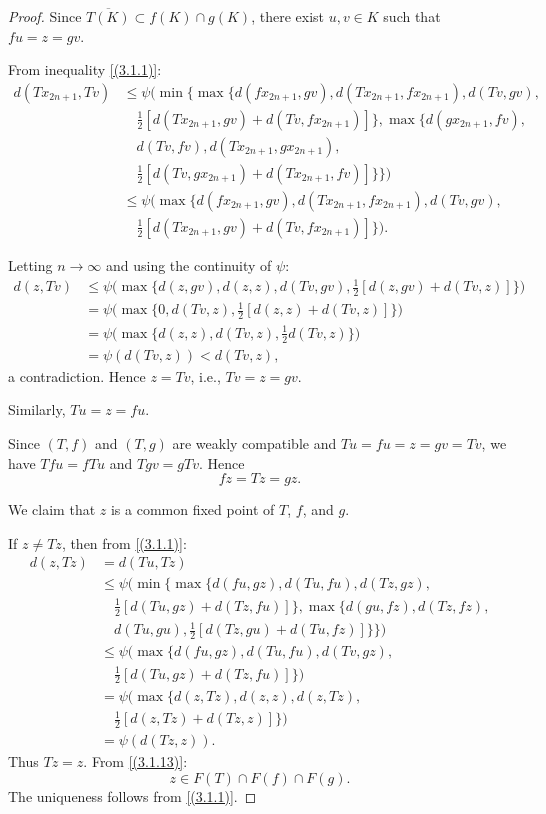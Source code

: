 \documentclass[a4paper,12pt,oneside]{article}
\numberwithin{equation}{section}
\begin{document}
\begin{proof}
Since $\overline{T(K)} \subset f(K) \cap g(K)$, there exist $u,v \in K$ such that $fu = z = gv$.

From inequality \eqref{(3.1.1)}:
\begin{align*}
d(Tx_{2n+1},Tv) &\leq \psi\Big(\min\Big\{\max\big\{d(fx_{2n+1},gv), d(Tx_{2n+1},fx_{2n+1}), d(Tv,gv), \\
&\quad \tfrac{1}{2}[d(Tx_{2n+1},gv) + d(Tv,fx_{2n+1})]\big\}, \max\big\{d(gx_{2n+1},fv), \\
&\quad d(Tv,fv), d(Tx_{2n+1},gx_{2n+1}), \\
&\quad \tfrac{1}{2}[d(Tv,gx_{2n+1}) + d(Tx_{2n+1},fv)]\big\}\Big\}\Big)\\
&\leq \psi\Big(\max\big\{d(fx_{2n+1},gv), d(Tx_{2n+1},fx_{2n+1}), d(Tv,gv), \\
&\quad \tfrac{1}{2}[d(Tx_{2n+1},gv) + d(Tv,fx_{2n+1})]\big\}\Big).
\end{align*}

Letting $n\to\infty$ and using the continuity of $\psi$:
\begin{align*}
d(z,Tv) &\leq \psi\Big(\max\big\{d(z,gv), d(z,z), d(Tv,gv), \tfrac{1}{2}[d(z,gv) + d(Tv,z)]\big\}\Big) \\
&= \psi\Big(\max\big\{0, d(Tv,z), \tfrac{1}{2}[d(z,z) + d(Tv,z)]\big\}\Big) \\
&= \psi\Big(\max\big\{d(z,z), d(Tv,z), \tfrac{1}{2}d(Tv,z)\big\}\Big) \\
&= \psi(d(Tv,z)) < d(Tv,z),
\end{align*}
a contradiction. Hence $z=Tv$, i.e., $Tv=z=gv$.

Similarly, $Tu=z=fu$.

Since $(T,f)$ and $(T,g)$ are weakly compatible and $Tu=fu=z=gv=Tv$, we have $Tfu=fTu$ and $Tgv=gTv$. Hence
\begin{equation}\label{(3.1.13)}
fz = Tz = gz.
\end{equation}

We claim that $z$ is a common fixed point of $T$, $f$, and $g$.

If $z \neq Tz$, then from \eqref{(3.1.1)}:
\begin{align*}
d(z,Tz) &= d(Tu,Tz) \\
&\leq \psi\Big(\min\Big\{\max\big\{d(fu,gz), d(Tu,fu), d(Tz,gz), \\
&\quad \tfrac{1}{2}[d(Tu,gz) + d(Tz,fu)]\big\}, \max\big\{d(gu,fz), d(Tz,fz), \\
&\quad d(Tu,gu), \tfrac{1}{2}[d(Tz,gu) + d(Tu,fz)]\big\}\Big\}\Big) \\
&\leq \psi\Big(\max\big\{d(fu,gz), d(Tu,fu), d(Tv,gz), \\
&\quad \tfrac{1}{2}[d(Tu,gz) + d(Tz,fu)]\big\}\Big) \\
&= \psi\Big(\max\big\{d(z,Tz), d(z,z), d(z,Tz), \\
&\quad \tfrac{1}{2}[d(z,Tz) + d(Tz,z)]\big\}\Big) \\
&= \psi(d(Tz,z)).
\end{align*}
Thus $Tz=z$.
From \eqref{(3.1.13)}:
\[
z \in F(T) \cap F(f) \cap F(g).
\]
The uniqueness follows from \eqref{(3.1.1)}.


\end{proof}
\end{document}
